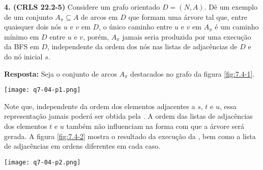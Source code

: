 
\noindent\textbf{4. (CRLS 22.2-5)} Considere um grafo orientado $D = (N, A)$. Dê um exemplo de um conjunto $A_\pi \subseteq A$ de arcos em $D$ que formam uma árvore tal que, entre quaisquer dois nós $u$ e $v$ em $D$, o único caminho entre $u$ e $v$ em $A_\pi$ é um caminho mínimo em $D$ entre $u$ e $v$, porém, $A_\pi$ jamais seria produzida por uma execução da BFS em $D$, independente da ordem dos nós nas listas de adjacências de $D$ e do nó inicial $s$.

\textbf{Resposta:} Seja o conjunto de arcos $A_\pi$ destacados no grafo da figura \ref{fig:7.4-1}.
\begin{center}
\texttt{[image: q7-04-p1.png]}
\label{fig:7.4-1}
\end{center}

Note que, independente da ordem dos elementos adjacentes a $s$, $t$ e $u$, essa representação jamais poderá ser obtida pela . A ordem das listas de adjacências dos elementos $t$ e $u$ também não influenciam na forma com que a árvore será gerada. A figura \ref{fig:7.4-2} mostra o resultado da execução da , bem como a lista de adjacências em ordens diferentes em cada caso.
\begin{center}
\texttt{[image: q7-04-p2.png]}
\label{fig:7.4-2}
\end{center}
